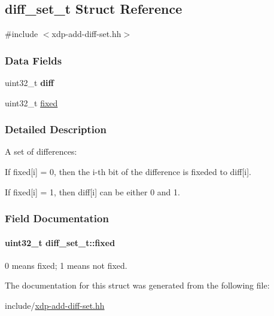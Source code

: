 \hypertarget{structdiff__set__t}{\subsection{diff\-\_\-set\-\_\-t \-Struct \-Reference}
\label{structdiff__set__t}
}


{\ttfamily \#include $<$xdp-\/add-\/diff-\/set.\-hh$>$}

\subsubsection*{\-Data \-Fields}
\begin{DoxyCompactItemize}
\item 
\hypertarget{structdiff__set__t_a028701b5c58534ae0f83b9574a9c5aa3}{uint32\-\_\-t {\bfseries diff}}\label{structdiff__set__t_a028701b5c58534ae0f83b9574a9c5aa3}

\item 
uint32\-\_\-t \hyperlink{structdiff__set__t_a508ddaddd1fcc2eb6938a08722fdfd50}{fixed}
\end{DoxyCompactItemize}


\subsubsection{\-Detailed \-Description}
\-A set of differences\-:
\begin{DoxyItemize}
\item \-If {\ttfamily fixed}\mbox{[}i\mbox{]} = 0, then the i-\/th bit of the difference is fixeded to {\ttfamily diff}\mbox{[}i\mbox{]}.
\item \-If {\ttfamily fixed}\mbox{[}i\mbox{]} = 1, then {\ttfamily diff}\mbox{[}i\mbox{]} can be either 0 and 1. 
\end{DoxyItemize}

\subsubsection{\-Field \-Documentation}
\hypertarget{structdiff__set__t_a508ddaddd1fcc2eb6938a08722fdfd50}{
\paragraph[{fixed}]{\setlength{\rightskip}{0pt plus 5cm}uint32\-\_\-t {\bf diff\-\_\-set\-\_\-t\-::fixed}}}\label{structdiff__set__t_a508ddaddd1fcc2eb6938a08722fdfd50}
0 means fixed; 1 means not fixed. 

\-The documentation for this struct was generated from the following file\-:\begin{DoxyCompactItemize}
\item 
include/\hyperlink{xdp-add-diff-set_8hh}{xdp-\/add-\/diff-\/set.\-hh}\end{DoxyCompactItemize}
